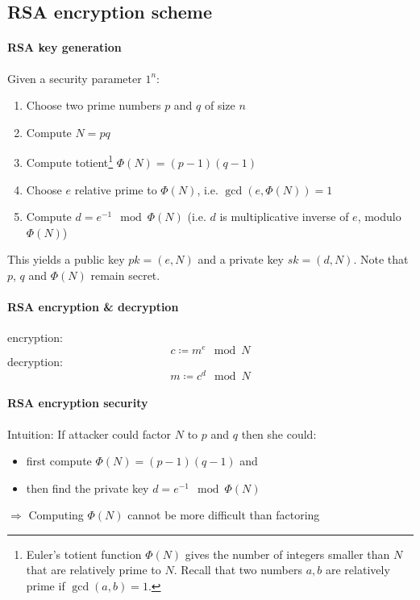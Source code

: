\subsection{RSA encryption scheme}

\paragraph{RSA key generation} Given a security parameter $1^n$:

\begin{enumerate}
    \item Choose two prime numbers $p$ and $q$ of size $n$
    \item Compute $N = pq$
    \item Compute totient\footnote{Euler's totient function $\Phi(N)$ gives the number of integers smaller than $N$ that are relatively prime to $N$. Recall that two numbers $a, b$ are relatively prime if $\operatorname{gcd}(a,b) = 1$.} $\Phi(N) = (p-1)(q-1)$
    \item Choose $e$ relative prime to $\Phi(N)$, i.e. $\gcd(e, \Phi(N))=1$
    \item Compute $d = e^{-1} \mod \Phi(N)$ (i.e. $d$ is multiplicative inverse of $e$, modulo $\Phi(N)$)
\end{enumerate}

This yields a public key $pk = (e, N)$ and a private key $sk = (d, N)$. Note that $p$, $q$ and $\Phi(N)$ remain secret.

\paragraph{RSA encryption \& decryption} \mbox{}

encryption: $$c \coloneqq m^e \mod N$$ 
decryption: $$m \coloneqq c^d \mod N$$

\paragraph{RSA encryption security} Intuition: If attacker could factor $N$ to $p$ and $q$ then she could:
\begin{itemize}
    \item first compute $\Phi(N) = (p-1)(q-1)$ and
    \item then find the private key $d = e^{-1} \mod \Phi(N)$
\end{itemize}

$\Rightarrow$ Computing $\Phi(N)$ cannot be more difficult than factoring


